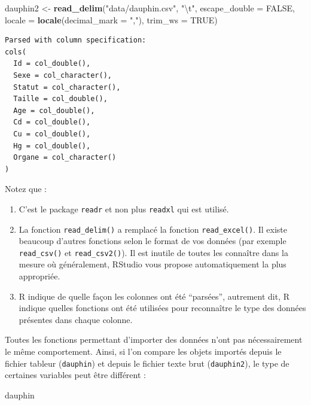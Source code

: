 \documentclass[a4paperpaper,]{article}
\newenvironment{Shaded}{\begin{snugshade}}{\end{snugshade}}
\newcommand{\CharTok}[1]{\textcolor[rgb]{0.57,0.30,0.62}{#1}}
\newcommand{\DataTypeTok}[1]{\textcolor[rgb]{0.00,0.34,0.68}{#1}}
\newcommand{\KeywordTok}[1]{\textcolor[rgb]{0.12,0.11,0.11}{\textbf{#1}}}
\newcommand{\NormalTok}[1]{\textcolor[rgb]{0.12,0.11,0.11}{#1}}
\newcommand{\OtherTok}[1]{\textcolor[rgb]{0.00,0.43,0.16}{#1}}
\newcommand{\StringTok}[1]{\textcolor[rgb]{0.75,0.01,0.01}{#1}}
\providecommand{\tightlist}{%
  \setlength{\itemsep}{0pt}\setlength{\parskip}{0pt}}
\begin{document}
\begin{Shaded}
\begin{Highlighting}[]
\NormalTok{dauphin2 <-}\StringTok{ }\KeywordTok{read_delim}\NormalTok{(}\StringTok{"data/dauphin.csv"}\NormalTok{, }\StringTok{"}\CharTok{\textbackslash{}t}\StringTok{"}\NormalTok{, }\DataTypeTok{escape_double =} \OtherTok{FALSE}\NormalTok{, }
    \DataTypeTok{locale =} \KeywordTok{locale}\NormalTok{(}\DataTypeTok{decimal_mark =} \StringTok{","}\NormalTok{), }\DataTypeTok{trim_ws =} \OtherTok{TRUE}\NormalTok{)}
\end{Highlighting}
\end{Shaded}

\begin{verbatim}
Parsed with column specification:
cols(
  Id = col_double(),
  Sexe = col_character(),
  Statut = col_character(),
  Taille = col_double(),
  Age = col_double(),
  Cd = col_double(),
  Cu = col_double(),
  Hg = col_double(),
  Organe = col_character()
)
\end{verbatim}

Notez que :

\begin{enumerate}
\def\labelenumi{\arabic{enumi}.}
\tightlist
\item
  C'est le package \texttt{readr} et non plus \texttt{readxl} qui est utilisé.
\item
  La fonction \texttt{read\_delim()} a remplacé la fonction \texttt{read\_excel()}. Il existe beaucoup d'autres fonctions selon le format de vos données (par exemple \texttt{read\_csv()} et \texttt{read\_csv2()}). Il est inutile de toutes les connaître dans la mesure où généralement, RStudio vous propose automatiquement la plus appropriée.
\item
  R indique de quelle façon les colonnes ont été ``parsées'', autrement dit, R indique quelles fonctions ont été utilisées pour reconnaître le type des données présentes dans chaque colonne.
\end{enumerate}

Toutes les fonctions permettant d'importer des données n'ont pas nécessairement le même comportement. Ainsi, si l'on compare les objets importés depuis le fichier tableur (\texttt{dauphin}) et depuis le fichier texte brut (\texttt{dauphin2}), le type de certaines variables peut être différent :

\begin{Shaded}
\begin{Highlighting}[]
\NormalTok{dauphin}
\end{Highlighting}
\end{Shaded}
\end{document}
